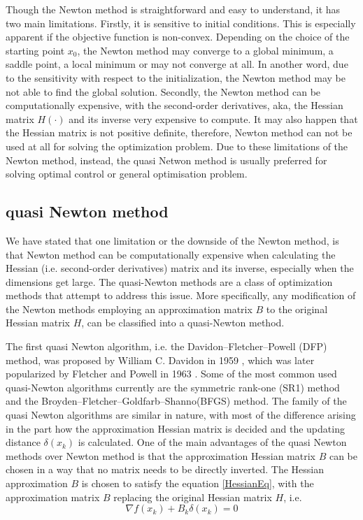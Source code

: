 \documentclass  [
  paper    = a4,
  BCOR     = 10mm,
  twoside,
  fontsize = 12pt,
  fleqn,
  toc      = bibnumbered,
  toc      = listofnumbered,
  numbers  = noendperiod,
  headings = normal,
  listof   = leveldown,
  version  = 3.03
]                                       {scrreprt}
\newcommand{\<}{\langle}
\renewcommand{\>}{\rangle}
\begin{document}
Though the Newton method is straightforward and easy to understand, it has two main limitations. Firstly, it is sensitive to initial conditions. This is especially apparent if the objective function is non-convex. Depending on the choice of the starting point $x_0$, the Newton method may converge to a global minimum, a saddle point, a local minimum or may not converge at all. In another word, due to the sensitivity with respect to the initialization, the Newton method may be not able to find the global solution. Secondly, the Newton method can be computationally expensive, with the second-order derivatives, aka, the Hessian matrix $H(\cdot)$ and its inverse very expensive to compute. It may also happen that the Hessian matrix is not positive definite, therefore, Newton method can not be used at all for solving the optimization problem. Due to these limitations of the Newton method, instead, the quasi Netwon method is usually preferred for solving optimal control or  general optimisation problem. 

\subsection{quasi Newton method}
We have stated that one limitation or the downside of the Newton method, is that Newton method can be computationally expensive when calculating the Hessian (i.e. second-order derivatives)  matrix and its inverse, especially when the dimensions get large. The quasi-Newton methods are a class of optimization methods that attempt to address this issue. More specifically, any modification of the Newton methods employing an approximation matrix $B$ to the original Hessian matrix $H$, can be classified into a quasi-Newton method. 

The first quasi Newton algorithm, i.e. the Davidon–Fletcher–Powell (DFP) method, was proposed by William C. Davidon in 1959 \cite{WilDav59}, which was later popularized by Fletcher and Powell in 1963 \cite{FlePow63}. Some of the most common used quasi-Newton algorithms currently are the symmetric rank-one (SR1) method \cite{ANP91} and the Broyden–Fletcher–Goldfarb–Shanno(BFGS) method. The family of the quasi Newton algorithms are similar in nature, with most of the difference arising in the part how the approximation Hessian matrix is decided and the updating distance $\delta(x_k) $ is calculated. One of the main advantages of the quasi Newton methods over Newton method is that the approximation Hessian matrix $B$ can be chosen in a way that no matrix needs to be directly inverted. The Hessian approximation $B$ is chosen to satisfy the equation \ref{HessianEq}, with the approximation matrix $B$ replacing the original Hessian matrix $H$, i.e. 
\begin{equation}
	\nabla f(x_k) +B_k\delta(x_k) =0
	\label{HessianAppro}
\end{equation}
\end{document}

